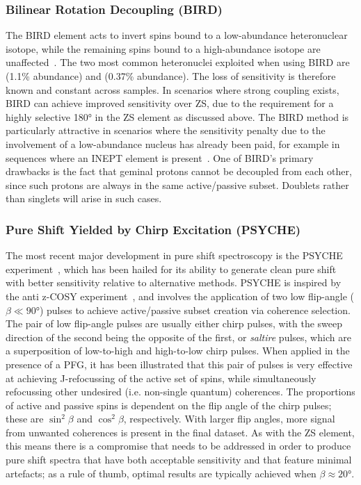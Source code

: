 \subsubsection{Bilinear Rotation Decoupling (BIRD)}
The \ac{BIRD} element acts to invert spins bound to a low-abundance
heteronuclear isotope, while the remaining spins bound to a high-abundance
isotope are unaffected~\cite{Garbow1982,Bax1983}.
The two most common heteronuclei exploited when using \ac{BIRD} are 
(1.1\% abundance) and  (0.37\% abundance). The loss of sensitivity
is therefore known and constant across samples. In scenarios where strong
coupling exists, \ac{BIRD} can achieve improved sensitivity over \ac{ZS}, due
to the requirement for a highly selective \ang{180} in the \ac{ZS} element as
discussed above.
The \ac{BIRD} method is particularly attractive in scenarios where the
sensitivity penalty due to the involvement of a low-abundance nucleus has
already been paid, for example in sequences where an \ac{INEPT} element is
present~\cite{Paudel2013}. One of \ac{BIRD}'s primary drawbacks is the fact that
geminal protons cannot be decoupled from each other, since such protons are
always in the same active/passive subset. Doublets rather than singlets will
arise in such cases.

\subsubsection{Pure Shift Yielded by Chirp Excitation (PSYCHE)}
\label{subsec:psyche}
The most recent major development in pure shift spectroscopy is the \ac{PSYCHE}
experiment~\cite{Foroozandeh2014,Foroozandeh2018}, which has been hailed for its
ability to generate clean pure shift with better sensitivity relative to
alternative methods. \ac{PSYCHE} is inspired by
the anti z-\ac{COSY} experiment~\cite{Thrippleton2003}, and involves the application
of two low flip-angle ($\beta \ll \ang{90}$) pulses to achieve active/passive
subset creation via coherence selection. The pair of low flip-angle pulses
are usually either chirp pulses, with the sweep direction of the second being
the opposite of the first, or \emph{saltire} pulses, which are a superposition
of low-to-high and high-to-low chirp pulses. When applied in the presence of a
\ac{PFG}, it has been illustrated that this pair of pulses is very effective at
achieving J-refocussing of the active set of spins, while simultaneously
refocussing other undesired (i.e. non-single quantum) coherences.
The proportions of active and passive spins is dependent on the flip angle of
the chirp pulses; these are $\sin^2 \beta$ and $\cos^2 \beta$,
respectively. With larger flip angles, more signal from unwanted
coherences is present in the final dataset. As with the \ac{ZS} element, this
means there is a compromise that needs to be addressed in order to produce
pure shift spectra that have both acceptable sensitivity and that feature
minimal artefacts; as a rule of thumb, optimal results are typically achieved
when $\beta \approx \ang{20}$.

